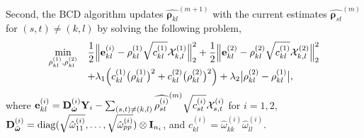 \documentclass[useAMS,usenatbib,referee]{bio}
\newcommand{\bs}{\boldsymbol}
\begin{document}
{{Second, the BCD algorithm updates $\widehat{\bs{\rho}_{kl}}^{(m+1)}$ with the current estimates $\widehat{\bs{\rho}_{st}}^{(m)}$ for $(s,t) \neq (k,l)$ by solving the following problem,
\begin{equation} \label{sub:obj}
\begin{array}{rl}
 \displaystyle  \min_{\rho^{(1)}_{kl},\rho^{(2)}_{kl}} &  \displaystyle 
 \frac{1}{2} \Big\| {\bf e}^{(i)}_{kl} - \rho^{(1)}_{kl} \sqrt{c^{(1)}_{kl}}\mathcal{X}^{(1)}_{k,l} \Big\|_2^2
   +\frac{1}{2} \Big\| {\bf e}^{(2)}_{kl} - \rho^{(2)}_{kl} \sqrt{c^{(1)}_{kl}} \mathcal{X}^{(2)}_{k,l} \Big\|_2^2 \\
&\displaystyle + \lambda_1 \Big(c^{(1)}_{kl}\big(\rho^{(1)}_{kl}\big)^2 +
c^{(2)}_{kl} \big(\rho^{(2)}_{kl}\big)^2 \Big)
  + \lambda_2 \big| \rho^{(2)}_{kl} - \rho^{(1)}_{kl} \big|,
\end{array}
\end{equation}
where $ {\bf e}^{(i)}_{kl} = {\bf D}^{(i)}_{\hat{\bs{\omega}}}\mathbf{Y}_i - \sum_{(s,t) \neq (k,l)} \widehat{\rho^{(i)}_{st}}^{(m)} \sqrt{c^{(i)}_{st}} \mathcal{X}^{(i)}_{s,t}$ for $i=1,2$, ${\bf D}^{(i)}_{\hat{\bs{\omega}}}= {\rm diag}(\sqrt{\hat{\omega}^{(i)}_{11}},\ldots, \sqrt{\hat{\omega}^{(i)}_{pp}})\otimes {\bf I}_{n_i}$, and $c^{(i)}_{kl} = {\hat{\omega}^{(i)}_{kk}\hat{\omega}^{(i)}_{ll}}$.

}}
\end{document}
